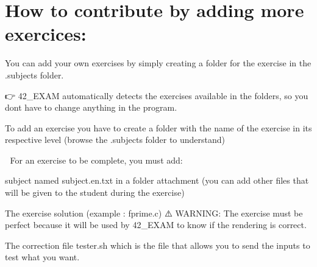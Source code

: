 \chapter{How to contribute by adding more exercices\+:}
\hypertarget{md__2_users_2thibault_2kdrive_21-_p_r_o_j_e_c_t_s_2_p-42_242-_e_x_a_m_2_c_o_n_t_r_i_b_u_t_i_n_g}{}\label{md__2_users_2thibault_2kdrive_21-_p_r_o_j_e_c_t_s_2_p-42_242-_e_x_a_m_2_c_o_n_t_r_i_b_u_t_i_n_g}
\label{md__2_users_2thibault_2kdrive_21-_p_r_o_j_e_c_t_s_2_p-42_242-_e_x_a_m_2_c_o_n_t_r_i_b_u_t_i_n_g_autotoc_md19}%
%


You can add your own exercises by simply creating a folder for the exercise in the {\ttfamily .subjects} folder.

👉 42\+\_\+\+EXAM automatically detects the exercises available in the folders, so you don\textquotesingle{}t have to change anything in the program.

To add an exercise you have to create a folder with the name of the exercise in its respective level (browse the .subjects folder to understand)



🔖 For an exercise to be complete, you must add\+:


\begin{DoxyItemize}
\item {} subject named {\ttfamily subject.\+en.\+txt} in a folder {\ttfamily attachment} (you can add other files that will be given to the student during the exercise)
\item The exercise solution (example \+: fprime.\+c) ⚠️ WARNING\+: The exercise must be perfect because it will be used by 42\+\_\+\+EXAM to know if the rendering is correct.
\item The correction file {\ttfamily tester.\+sh} which is the file that allows you to send the inputs to test what you want.
\end{DoxyItemize}


\begin{DoxyCode}{0}
\DoxyCodeLine{\ |}
\DoxyCodeLine{\ |}
\DoxyCodeLine{\ |}
\DoxyCodeLine{\ |}

\end{DoxyCode}


